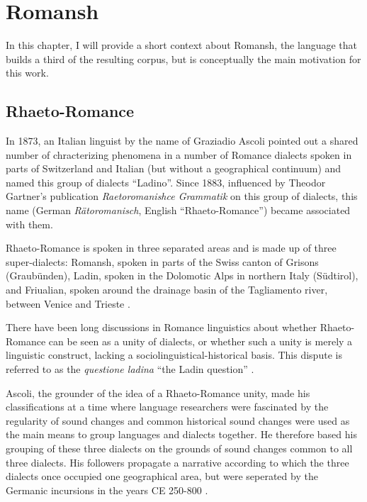 \chapter{Romansh}

In this chapter, I will provide a short context about Romansh, the language that builds a third of the resulting corpus, but is conceptually the main motivation for this work.

\section{Rhaeto-Romance}
In 1873, an Italian linguist by the name of Graziadio Ascoli pointed out a shared number of chracterizing phenomena in a number of Romance dialects spoken in parts of Switzerland and Italian (but without a geographical continuum) and named this group of dialects \enquote{Ladino}. Since 1883, influenced by Theodor Gartner's publication \emph{Raetoromanishce Grammatik} on this group of dialects, this name (German \emph{Rätoromanisch}, English \enquote{Rhaeto-Romance}) became associated with them. 

Rhaeto-Romance is spoken in three separated areas and is made up of three super-dialects: Romansh, spoken in parts of the Swiss canton of Grisons (Graubünden), Ladin, spoken in the Dolomotic Alps in northern Italy (Südtirol), and Friualian, spoken around the drainage basin of the Tagliamento river, between Venice and Trieste \autocite[1]{haiman1992}.

There have been long discussions in Romance linguistics about whether Rhaeto-Romance can be seen as a unity of dialects, or whether such a unity is merely a linguistic construct, lacking a sociolinguistical-historical basis. 
This dispute is referred to as the \emph{questione ladina} \enquote{the Ladin question} \autocite{liver1999}. 

Ascoli, the grounder of the idea of a Rhaeto-Romance unity, made his classifications at a time where language researchers were fascinated by the regularity of sound changes and common historical sound changes were used as the main means to group languages and dialects together. He therefore based his grouping of these three dialects on the grounds of sound changes common to all three dialects. 
His followers propagate a narrative according to which the three dialects once occupied one geographical area, but were seperated by the Germanic incursions in the years CE 250-800 \autocites[174]{bossong2008}[11]{haiman1992}.

